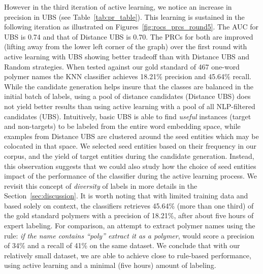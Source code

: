 However in the third iteration of active learning, we notice an increase in precision in UBS (see Table~\ref{tab:pr_table}). 
This learning is sustained in the following iteration as illustrated on Figures~\ref{fig:rocs_prcs_round5}. 
The AUC for UBS is 0.74 and that of Distance UBS is 0.70. 
The PRCs for both are improved (lifting away from the lower left corner of the graph) over the first round with active learning with UBS showing better tradeoff than with Distance UBS and Random strategies.
When tested against our gold standard of 467 one-word polymer names the KNN classifier achieves 18.21\% precision and  45.64\% recall. 
While the candidate generation helps insure that the classes are balanced in the initial batch of labels, using a pool of distance candidates (Distance UBS) does not yield better results than using active learning with a pool of all NLP-filtered candidates (UBS).
Intuitively, basic UBS is able to find \textit{useful} instances (target and non-targets) to be labeled from the entire word embedding space, while examples from Distance UBS are clustered around the seed entities which may be colocated in that space.
We selected seed entities based on their frequency in our corpus, and the yield of target entities during the candidate generation.
Instead, this observation suggests that we could also study how the choice of seed entities impact of the performance of the classifier during the active learning process. 
We revisit this concept of \textit{diversity} of labels in more details in the Section~\ref{sec:discussion}. 
It is worth noting that with limited training data and based solely on context, the classifiers retrieves 45.64\% (more than one third) of the gold standard polymers with a precision of 18.21\%, after about five hours of expert labeling. 
For comparison, an attempt to extract polymer names using the rule: \textit{if the name contains ``poly'' extract it as a polymer}, would score a precision of 34\% and a recall of 41\% on the same dataset.
We conclude that with our relatively small dataset, we are able to achieve close to rule-based performance, using active learning and a minimal (five hours) amount of labeling.

